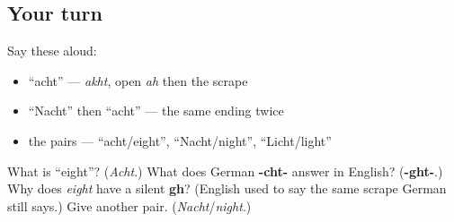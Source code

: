\subsection*{Your turn}
Say these aloud:

\begin{itemize}
\raggedright
  \item \textquotedblleft{}acht\textquotedblright{} — \emph{akht}, open \emph{ah} then the scrape
  \item \textquotedblleft{}Nacht\textquotedblright{} then \textquotedblleft{}acht\textquotedblright{} — the same ending twice
  \item the pairs — \textquotedblleft{}acht/eight\textquotedblright{}, \textquotedblleft{}Nacht/night\textquotedblright{}, \textquotedblleft{}Licht/light\textquotedblright{}
\end{itemize}

\begin{tcolorbox}[breakable,colback=teal!4,colframe=teal!35!black,title={Before you move on}]
What is \textquotedblleft{}eight\textquotedblright{}? (\emph{Acht}.) What does German \textbf{-cht-} answer in English? (\textbf{-ght-}.) Why does \emph{eight} have a silent \textbf{gh}? (English used to say the same scrape German still says.) Give another pair. (\emph{Nacht}/\emph{night}.)
\end{tcolorbox}
